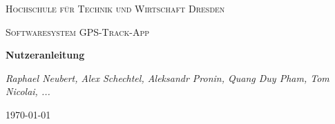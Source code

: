\documentclass{article}
\begin{document}
\begin{titlepage}
    \centering
    {\scshape\LARGE Hochschule für Technik und Wirtschaft Dresden \par}
    \vspace{1cm}
    {\scshape\Large Softwaresystem \glqq GPS-Track-App\grqq\par}
    \vspace{1.5cm}
    {\huge\bfseries Nutzeranleitung\par}
    \vspace{2cm}
    {\Large\itshape Raphael Neubert, Alex Schechtel, Aleksandr Pronin, Quang Duy Pham, Tom Nicolai, ... \par}
    \vfill

    {\large \today\par}
\end{titlepage}

\tableofcontents

\newpage
\end{document}

